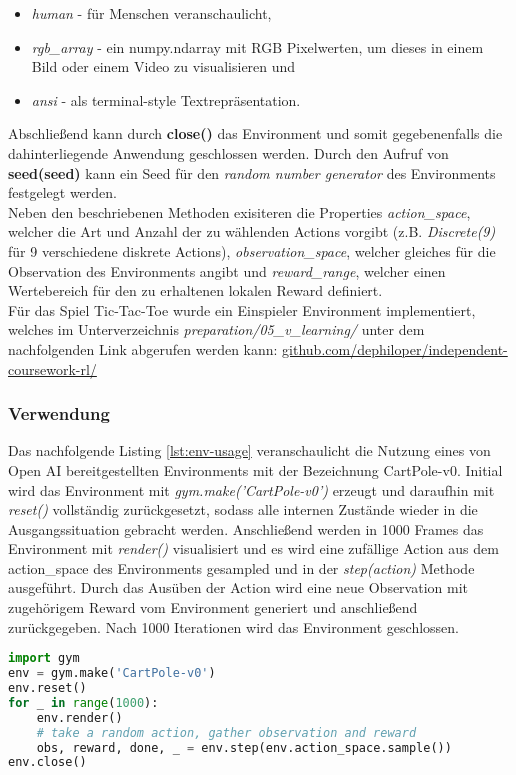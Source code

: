 \documentclass[11pt]{scrartcl}
\begin{document}
\begin{itemize}
\itemsep0pt
\item \textit{human} - für Menschen veranschaulicht, 
\item \textit{rgb\_array} - ein numpy.ndarray mit RGB Pixelwerten, um dieses in einem Bild oder einem 
Video zu visualisieren und 
\item \textit{ansi} - als terminal-style Textrepräsentation.
\end{itemize}
\noindent
Abschließend kann durch \textbf{close()} das Environment und somit gegebenenfalls die 
dahinterliegende Anwendung geschlossen werden. Durch den Aufruf von 
\textbf{seed(seed)} kann ein Seed für den \textit{random number generator}
des Environments festgelegt werden.\\

Neben den beschriebenen Methoden exisiteren die Properties \textit{action\_space}, welcher die
Art und Anzahl der zu wählenden Actions vorgibt (z.B. \textit{Discrete(9)} für 9 verschiedene
diskrete Actions), \textit{observation\_space}, welcher gleiches für die Observation des
Environments angibt und \textit{reward\_range}, welcher einen Wertebereich für den zu erhaltenen
lokalen Reward definiert.\\
Für das Spiel Tic-Tac-Toe wurde ein Einspieler Environment implementiert, welches im
Unterverzeichnis \textit{preparation/05\_v\_learning/} unter dem nachfolgenden Link abgerufen
werden kann: \url{github.com/dephiloper/independent-coursework-rl/}


\subsubsection{Verwendung}
Das nachfolgende Listing \autoref{lst:env-usage} veranschaulicht die Nutzung eines von Open AI
bereitgestellten Environments mit der Bezeichnung CartPole-v0. Initial wird das Environment
mit \textit{gym.make('CartPole-v0')} erzeugt und daraufhin mit \textit{reset()} vollständig
zurückgesetzt, sodass alle internen Zustände wieder in die Ausgangssituation gebracht werden. 
Anschließend werden in 1000 Frames das Environment mit \textit{render()} visualisiert und es
wird eine zufällige Action aus dem action\_space des Environments gesampled und in der
\textit{step(action)} Methode ausgeführt. Durch das Ausüben der Action wird eine neue
Observation mit zugehörigem Reward vom Environment generiert und anschließend zurückgegeben.
Nach 1000 Iterationen wird das Environment geschlossen. 
\begin{lstlisting}[language=Python, caption=environment usage, label=lst:env-usage]
import gym
env = gym.make('CartPole-v0')
env.reset()
for _ in range(1000):
    env.render()
    # take a random action, gather observation and reward
    obs, reward, done, _ = env.step(env.action_space.sample())
env.close()
\end{lstlisting}
\end{document}
